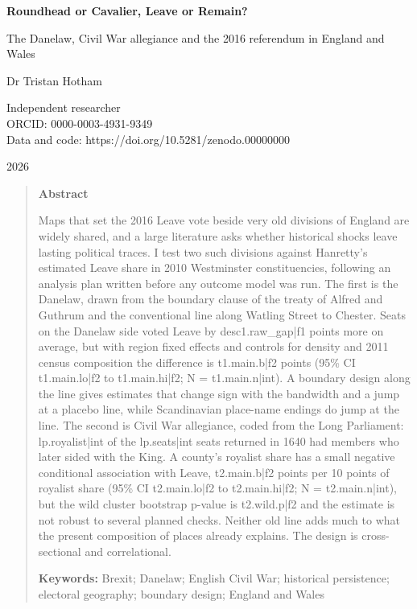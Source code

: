 \documentclass[11pt,a4paper]{article}
\begin{document}
\begin{center}
{\Large\bfseries Roundhead or Cavalier, Leave or Remain?\par}
\vspace{0.4em}
{\large The Danelaw, Civil War allegiance and the 2016 referendum in England and Wales\par}
\vspace{1.2em}
{\large Dr Tristan Hotham\par}
\vspace{0.3em}
{\small Independent researcher\\
ORCID: 0000-0003-4931-9349\\
Data and code: https://doi.org/10.5281/zenodo.00000000\par}
\vspace{0.8em}
2026
\end{center}

\begin{quote}
\small
\begin{center}\textbf{Abstract}\end{center}
Maps that set the 2016 Leave vote beside very old divisions of England are widely shared, and a large literature asks whether historical shocks leave lasting political traces. I test two such divisions against Hanretty's estimated Leave share in 2010 Westminster constituencies, following an analysis plan written before any outcome model was run. The first is the Danelaw, drawn from the boundary clause of the treaty of Alfred and Guthrum and the conventional line along Watling Street to Chester. Seats on the Danelaw side voted Leave by {{desc1.raw_gap|f1}} points more on average, but with region fixed effects and controls for density and 2011 census composition the difference is {{t1.main.b|f2}} points (95\% CI {{t1.main.lo|f2}} to {{t1.main.hi|f2}}; N = {{t1.main.n|int}}). A boundary design along the line gives estimates that change sign with the bandwidth and a jump at a placebo line, while Scandinavian place-name endings do jump at the line. The second is Civil War allegiance, coded from the Long Parliament: {{lp.royalist|int}} of the {{lp.seats|int}} seats returned in 1640 had members who later sided with the King. A county's royalist share has a small negative conditional association with Leave, {{t2.main.b|f2}} points per 10 points of royalist share (95\% CI {{t2.main.lo|f2}} to {{t2.main.hi|f2}}; N = {{t2.main.n|int}}), but the wild cluster bootstrap p-value is {{t2.wild.p|f2}} and the estimate is not robust to several planned checks. Neither old line adds much to what the present composition of places already explains. The design is cross-sectional and correlational.

\textbf{Keywords:} Brexit; Danelaw; English Civil War; historical persistence; electoral geography; boundary design; England and Wales
\end{quote}
\end{document}
